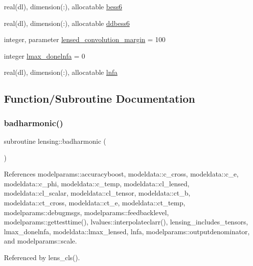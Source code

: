 \begin{DoxyCompactItemize}
real(dl), dimension(\+:), allocatable \mbox{\hyperlink{namespacelensing_aba411bd5dd31565120f85d0a89b71ba5}{bess6}}
\item 
real(dl), dimension(\+:), allocatable \mbox{\hyperlink{namespacelensing_aae19084149f8642419ba2ae3f6b82b76}{ddbess6}}
\item 
integer, parameter \mbox{\hyperlink{namespacelensing_ae086e70cafd6706bebf9c49e4faa88e5}{lensed\+\_\+convolution\+\_\+margin}} = 100
\item 
integer \mbox{\hyperlink{namespacelensing_aa8604328cfd9ca10730507837b4867fe}{lmax\+\_\+donelnfa}} = 0
\item 
real(dl), dimension(\+:), allocatable \mbox{\hyperlink{namespacelensing_aa64764c9338c8a6fc4f30497223a0b67}{lnfa}}
\end{DoxyCompactItemize}


\subsection{Function/\+Subroutine Documentation}
\mbox{\label{namespacelensing_a68242ee3fa839802f6aed94e9f8dcf73}} 
\subsubsection{\texorpdfstring{badharmonic()}{badharmonic()}}
{\footnotesize\ttfamily subroutine lensing\+::badharmonic (\begin{DoxyParamCaption}{ }\end{DoxyParamCaption})}



References modelparams\+::accuracyboost, modeldata\+::c\+\_\+cross, modeldata\+::c\+\_\+e, modeldata\+::c\+\_\+phi, modeldata\+::c\+\_\+temp, modeldata\+::cl\+\_\+lensed, modeldata\+::cl\+\_\+scalar, modeldata\+::cl\+\_\+tensor, modeldata\+::ct\+\_\+b, modeldata\+::ct\+\_\+cross, modeldata\+::ct\+\_\+e, modeldata\+::ct\+\_\+temp, modelparams\+::debugmsgs, modelparams\+::feedbacklevel, modelparams\+::gettesttime(), lvalues\+::interpolateclarr(), lensing\+\_\+includes\+\_\+tensors, lmax\+\_\+donelnfa, modeldata\+::lmax\+\_\+lensed, lnfa, modelparams\+::outputdenominator, and modelparams\+::scale.



Referenced by lens\+\_\+cls().


